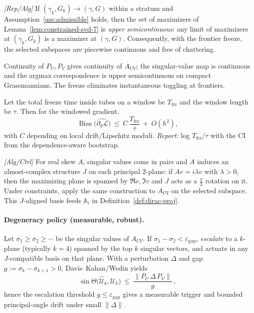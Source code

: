 \begin{lemma}\label{lem:usc-planes}
\emph{[\textup{Rep/Alg}]}
If $(\gamma_k,G_k)\to(\gamma,G)$ within a stratum and Assumption~\ref{ass:admissible} holds, then the set of maximizers of Lemma~\ref{lem:constrained-svd-7} is \emph{upper semicontinuous}: any limit of maximizers at $(\gamma_k,G_k)$ is a maximizer at $(\gamma,G)$. 
Consequently, with the frontier freeze, the selected subspaces are piecewise continuous and free of chattering.
\begin{proofsketch}
Continuity of $P_U,P_V$ gives continuity of $A_{UV}$; the singular-value map is continuous and the argmax correspondence is upper semicontinuous on compact Grassmannians. The freeze eliminates instantaneous toggling at frontiers.
\end{proofsketch}
\end{lemma}

\begin{proposition}\label{prop:freeze-bias}
Let the total freeze time inside tubes on a window be $T_{\mathrm{frz}}$ and the window length be $\tau$. 
Then for the windowed gradient,
\[
\operatorname{Bias}\big(\widehat{\partial_\theta \mathcal L}\big)\ \le\ C\,\frac{T_{\mathrm{frz}}}{\tau}\ +\ O(h^2),
\]
with $C$ depending on local drift/Lipschitz moduli. \emph{Report:} log $T_{\mathrm{frz}}/\tau$ with the CI from the dependence-aware bootstrap.
\end{proposition}

\begin{remark}\label{rem:skew-J-7}
\emph{[\textup{Alg/Ctrl}]}
For real skew $A$, singular values come in pairs and $A$ induces an almost-complex structure $J$ on each principal \(2\)-plane: if $Av=i\lambda v$ with $\lambda>0$, then the maximizing plane is spanned by $\Re v,\Im v$ and $J$ acts as a $\tfrac\pi2$ rotation on it. Under constraints, apply the same construction to $A_{UV}$ on the selected subspace. This $J$-aligned basis feeds $\mathbb A_i$ in Definition~\ref{def:dirac-proj}.
\end{remark}

\paragraph{Degeneracy policy (measurable, robust).}
Let $\sigma_1\ge\sigma_2\ge\cdots$ be the singular values of $A_{UV}$. 
If $\sigma_1-\sigma_2<\varepsilon_{\mathrm{gap}}$, \emph{escalate} to a $k$-plane (typically $k=4$) spanned by the top $k$ singular vectors, and actuate in any $J$-compatible basis on that plane. 
With a perturbation $\Delta$ and gap $g:=\sigma_k-\sigma_{k+1}>0$, Davis--Kahan/Wedin yields
\[
\sin\Theta\big(\widehat{\mathcal U}_k,\mathcal U_k\big)\ \le\ \frac{\|P_U\,\Delta\,P_V\|}{g}\,,
\]
hence the escalation threshold $g\le\varepsilon_{\mathrm{gap}}$ gives a measurable trigger and bounded principal-angle drift under small $\|\Delta\|$.

